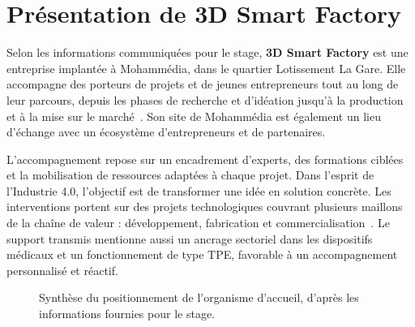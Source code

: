\documentclass[12pt,a4paper,oneside]{report}
\begin{document}
\section{Présentation de 3D Smart Factory}

Selon les informations communiquées pour le stage, \textbf{3D Smart Factory} est
une entreprise implantée à Mohammédia, dans le quartier Lotissement La Gare. Elle
accompagne des porteurs de projets et de jeunes entrepreneurs tout au long de
leur parcours, depuis les phases de recherche et d'idéation jusqu'à la production
et à la mise sur le marché~\cite{organisationSource}. Son site de Mohammédia est
également un lieu d'échange avec un écosystème d'entrepreneurs et de partenaires.

L'accompagnement repose sur un encadrement d'experts, des formations ciblées et
la mobilisation de ressources adaptées à chaque projet. Dans l'esprit de
l'Industrie 4.0, l'objectif est de transformer une idée en solution concrète.
Les interventions portent sur des projets technologiques couvrant plusieurs
maillons de la chaîne de valeur : développement, fabrication et
commercialisation~\cite{organisationSource}. Le support transmis mentionne aussi
un ancrage sectoriel dans les dispositifs médicaux et un fonctionnement de type
TPE, favorable à un accompagnement personnalisé et réactif.

\begin{figure}[H]
\centering
{}
\caption{Synthèse du positionnement de l'organisme d'accueil, d'après les informations fournies pour le stage.}
\label{fig:3dsmartfactory}
\end{figure}
\end{document}
